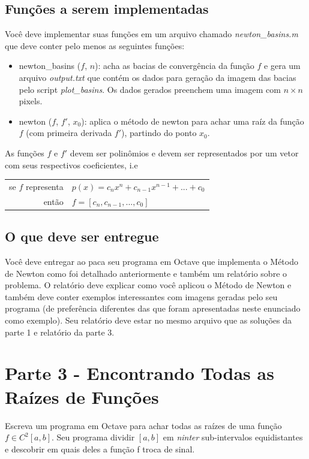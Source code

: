 \documentclass[12pt]{article}
\begin{document}
\subsection{Funções a serem implementadas}
Você deve implementar suas funções em um arquivo chamado 
{\em newton\_basins.m} que deve conter pelo menos as seguintes funções:
\begin{itemize}
    \item{newton\_basins ($f$, $n$):} acha as bacias de convergência da 
        função $f$ e gera um arquivo {\em output.txt} que contém os dados
        para geração da imagem das bacias pelo script {\em plot\_basins}.
        Os dados gerados preenchem uma imagem com $n \times n$ pixels.
    \item{newton ($f$, $f'$, $x_0$):} aplica o método de newton para 
        achar uma raíz da função $f$ (com primeira derivada $f'$), 
        partindo do ponto $x_0$.
\end{itemize}
As funções $f$ e $f'$ devem ser polinômios e devem ser representados
por um vetor com seus respectivos coeficientes, i.e
\begin{center}
    \begin{tabular}{r l}
        se $f$ representa & $p(x) = c_nx^n + c_{n - 1}x^{n - 1} + ... 
            + c_0$ \\
        então & $f = [c_n, c_{n - 1}, ..., c_0]$

    \end{tabular}
\end{center}

\subsection{O que deve ser entregue}
Você deve entregar ao paca seu programa em Octave que implementa o 
Método de Newton como foi detalhado anteriormente e também um 
relatório sobre o problema. O relatório deve explicar como
você aplicou o Método de Newton e também deve conter exemplos 
interessantes com imagens geradas pelo seu programa (de preferência
diferentes das que foram apresentadas neste enunciado como exemplo).
Seu relatório deve estar no mesmo arquivo que as soluções da parte 1 e
relatório da parte 3.

\section{Parte 3 - Encontrando Todas as Raízes de Funções}
Escreva um programa em Octave para achar todas as raízes de uma função
$f \in C^2[a,b]$. Seu programa dividir $[a, b]$ em {\em ninter} 
sub-intervalos equidistantes e descobrir em quais deles a função f 
troca de sinal.
\end{document}
